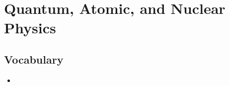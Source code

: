 \section{Quantum, Atomic, and Nuclear Physics}

\subsection{Vocabulary}
\begin{itemize}
    \item 
\end{itemize}

